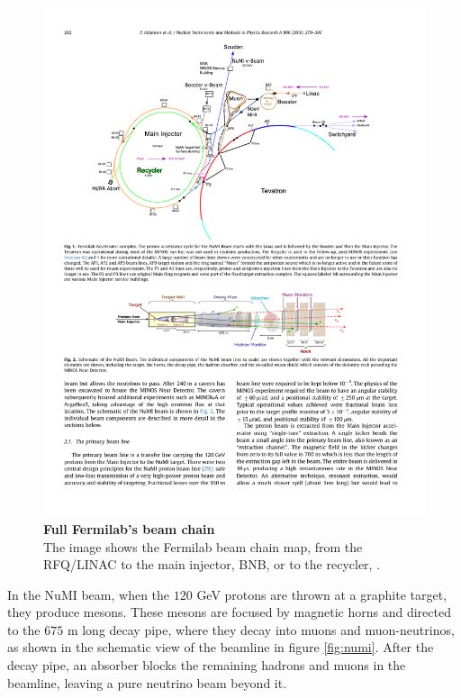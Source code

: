 \newpage
\begin{figure}[h!]
	\begin{center}
		\includegraphics[scale=0.8]{Figures/acceleratorChain.pdf}
		\caption[Full Fermilab's beam chain]{ {\textbf{Full Fermilab's beam chain}} \\The image shows the Fermilab beam chain map, from the RFQ/LINAC to the main injector, BNB, or to the recycler, \cite{paper_numibeamline}.}
		\label{accelerator_chain}	
	\end{center}
\end{figure}
%

In the NuMI beam, when the $120$ GeV protons are thrown at a graphite target, they produce mesons. These mesons are focused by magnetic horns and directed to the $675$ m long decay pipe, where they decay into muons and muon-neutrinos, as shown in the schematic view of the beamline in figure \ref{fig:numi}. After the decay pipe, an absorber blocks the remaining hadrons and muons in the beamline, leaving a pure neutrino beam beyond it. 

